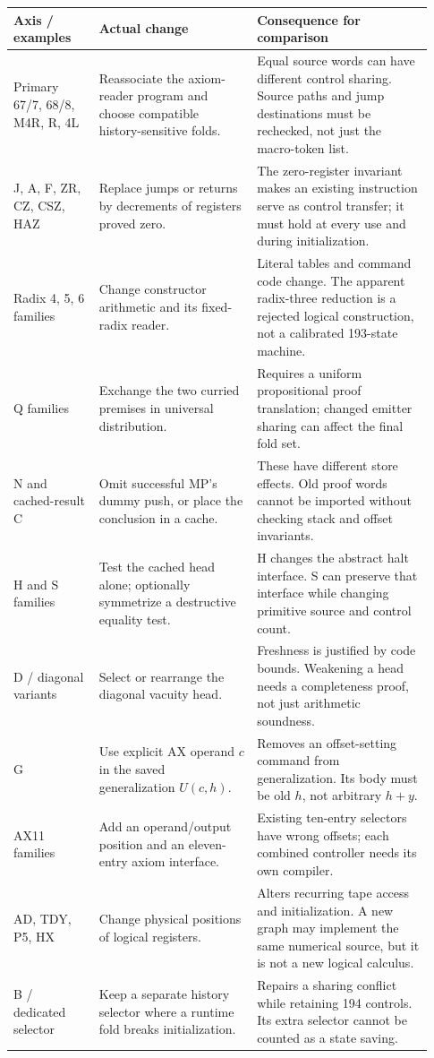 \documentclass[11pt,letterpaper]{article}
\begin{document}
\begin{longtable}{@{}p{0.19\linewidth}p{0.35\linewidth}p{0.39\linewidth}@{}}
\toprule
Axis / examples & Actual change & Consequence for comparison\\
\midrule\endhead
Primary 67/7, 68/8, M4R, R, 4L & Reassociate the axiom-reader program and choose compatible history-sensitive folds. & Equal source words can have different control sharing. Source paths and jump destinations must be rechecked, not just the macro-token list.\\[3pt]
J, A, F, ZR, CZ, CSZ, HAZ & Replace jumps or returns by decrements of registers proved zero. & The zero-register invariant makes an existing instruction serve as control transfer; it must hold at every use and during initialization.\\[3pt]
Radix 4, 5, 6 families & Change constructor arithmetic and its fixed-radix reader. & Literal tables and command code change. The apparent radix-three reduction is a rejected logical construction, not a calibrated 193-state machine.\\[3pt]
Q families & Exchange the two curried premises in universal distribution. & Requires a uniform propositional proof translation; changed emitter sharing can affect the final fold set.\\[3pt]
N and cached-result C & Omit successful MP's dummy push, or place the conclusion in a cache. & These have different store effects. Old proof words cannot be imported without checking stack and offset invariants.\\[3pt]
H and S families & Test the cached head alone; optionally symmetrize a destructive equality test. & H changes the abstract halt interface. S can preserve that interface while changing primitive source and control count.\\[3pt]
D / diagonal variants & Select or rearrange the diagonal vacuity head. & Freshness is justified by code bounds. Weakening a head needs a completeness proof, not just arithmetic soundness.\\[3pt]
G & Use explicit AX operand $c$ in the saved generalization $U(c,h)$. & Removes an offset-setting command from generalization. Its body must be old $h$, not arbitrary $h+y$.\\[3pt]
AX11 families & Add an operand/output position and an eleven-entry axiom interface. & Existing ten-entry selectors have wrong offsets; each combined controller needs its own compiler.\\[3pt]
AD, TDY, P5, HX & Change physical positions of logical registers. & Alters recurring tape access and initialization. A new graph may implement the same numerical source, but it is not a new logical calculus.\\[3pt]
B / dedicated selector & Keep a separate history selector where a runtime fold breaks initialization. & Repairs a sharing conflict while retaining 194 controls. Its extra selector cannot be counted as a state saving.\\
\bottomrule
\end{longtable}
\end{document}
